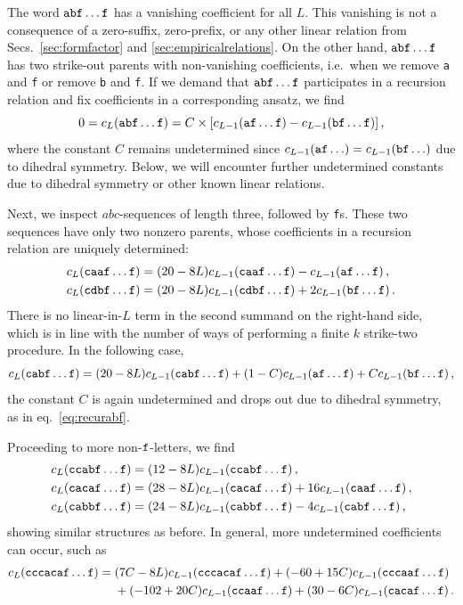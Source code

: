 \documentclass[12pt]{article}
\begin{document}
The word  ${\tt abf\dots f}$ has a vanishing coefficient for all $L$.  This vanishing is not a consequence of a zero-suffix, zero-prefix, or any other linear relation from Secs.~\ref{sec:formfactor} and \ref{sec:empiricalrelations}.  On the other hand, ${\tt abf\dots f}$ has two strike-out parents with non-vanishing coefficients, i.e.~when we remove {\tt a} and {\tt f} or remove {\tt b} and {\tt f}.  If we demand that ${\tt abf\dots f}$ participates in a recursion relation and fix coefficients in a corresponding ansatz, we find 
\begin{equation}
    0=c_L({\tt abf\dots f})= C \times [ c_{L-1}({\tt af\dots f})- c_{L-1}({\tt bf\dots f})]\,,
  \label{eq:recurabf}  
\end{equation}
where the constant $C$ remains undetermined since $c_{L-1}({\tt af\dots})= c_{L-1}({\tt bf\dots})$ due to dihedral symmetry.
Below, we will encounter further undetermined constants due to dihedral symmetry or other known linear relations.

Next, we inspect $abc$-sequences of length three, followed by {\tt f}s.
These two sequences have only two nonzero parents, whose coefficients in a recursion relation are uniquely determined:
\begin{align}
    c_{L}({\tt caaf\dots f}) &= (20 - 8 L) c_{L-1}({\tt caaf\dots f}) - c_{L-1}({\tt af\dots f})\,,\\
    c_L({\tt cdbf\dots f}) &= (20 - 8 L) c_{L-1}({\tt cdbf\dots f}) + 2 c_{L-1}({\tt bf\dots f})\,.
\end{align}
There is no linear-in-$L$ term in the second summand on the right-hand side, which is in line with the number of ways of performing a finite $k$ strike-two procedure.
In the following case,
\begin{equation}
    c_{L}({\tt cabf\dots f}) = (20 - 8 L) c_{L-1}({\tt cabf\dots f}) + (1 - C) c_{L-1}({\tt 
af\dots f}) + C c_{L-1}({\tt bf\dots f})\,,
\end{equation}
the constant $C$ is again undetermined and drops out due to dihedral symmetry, as in eq.~\eqref{eq:recurabf}.

Proceeding to more non-${\tt f}$-letters, we find
\begin{align}
c_L({\tt ccabf\dots f}) &= (12 - 8 L) c_{L-1}({\tt ccabf\dots f})\,,\\
c_L({\tt cacaf\dots f}) &= (28 - 8 L) c_{L-1}({\tt cacaf\dots f}) + 16 c_{L-1}({\tt caaf\dots f})\,,\\
c_L({\tt cabbf\dots f}) &= (24 - 8 L) c_{L-1}({\tt cabbf\dots f}) - 4 c_{L-1}({\tt cabf\dots f})\,,
\end{align}
showing similar structures as before.
In general, more undetermined coefficients can occur, such as
\begin{equation}
\begin{aligned}
c_L({\tt cccacaf\dots f}) = {}&(7 C - 8 L) c_{L-1}({\tt cccacaf\dots f}) +    (-60 + 15 C) c_{L-1}({\tt cccaaf\dots f}) \\&+ (-102 + 20 C) c_{L-1}({\tt ccaaf\dots f}) + (30 - 6 C) c_{L-1}({\tt cacaf\dots f})\,.
\end{aligned}
\end{equation}
\end{document}
